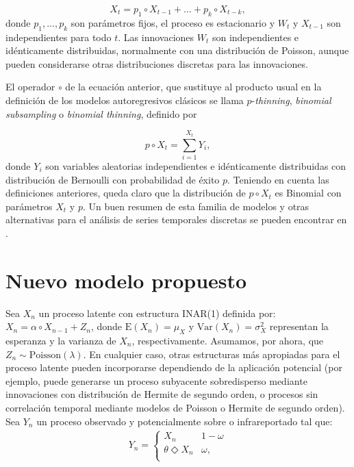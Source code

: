 \documentclass[12pt,twoside]{article} %
\begin{document}
\begin{equation}
X_t = p_1 \circ X_{t-1} + \ldots + p_k \circ X_{t-k},
\end{equation}
donde $p_1, \ldots, p_k$ son parámetros fijos, el proceso es estacionario y $W_t$ y $X_{t-1}$ son independientes para todo $t$. Las innovaciones $W_t$ son independientes e idénticamente distribuidas, normalmente con una distribución de Poisson, aunque pueden considerarse otras distribuciones discretas para las innovaciones.

El operador $\circ$ de la ecuación anterior, que sustituye al producto usual en la definición de los modelos autoregresivos clásicos se llama $p$-\textit{thinning}, \textit{binomial subsampling} o \textit{binomial thinning}, definido por

\begin{equation}
p \circ X_t = \sum_{i=1}^{X_t} Y_i,
\end{equation}
donde $Y_i$ son variables aleatorias independientes e idénticamente distribuidas con distribución de Bernoulli con probabilidad de éxito $p$. Teniendo en cuenta las definiciones anteriores, queda claro que la distribución de $p \circ X_t$ es Binomial con parámetros $X_t$ y $p$. Un buen resumen de esta familia de modelos y otras alternativas para el análisis de series temporales discretas se pueden encontrar en \cite{McKenzie2003}.

\section{Nuevo modelo propuesto}  %

Sea $X_n$ un proceso latente con estructura INAR(1) definida por: $X_n=\alpha \circ X_{n-1}+Z_n$, donde $\textrm{E}(X_n)=\mu_X$ y $\textrm{Var}(X_n)=\sigma_X^2$ representan la esperanza y la varianza de $X_n$, respectivamente. Asumamos, por ahora, que $Z_n \sim \textrm{Poisson}(\lambda)$. En cualquier caso, otras estructuras más apropiadas para el proceso latente pueden incorporarse dependiendo de la aplicación potencial (por ejemplo, puede generarse un proceso subyacente sobredisperso mediante innovaciones con distribución de Hermite de segundo orden, o procesos sin correlación temporal mediante modelos de Poisson o Hermite de segundo orden). Sea $Y_n$ un proceso observado y potencialmente sobre o infrareportado tal que: 
\begin{align}\label{eq0:modelfatthin}
 Y_n=\begin{cases} 
X_n &  1-\omega \\
\theta \Diamond X_n & \omega, \\
   \end{cases}
\end{align}
\end{document}

